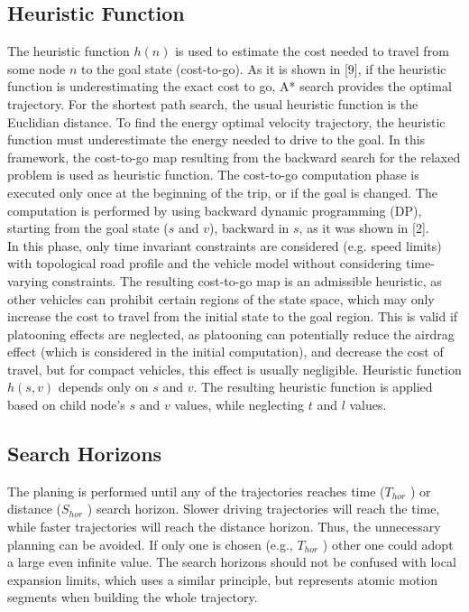 \documentclass{thesisreport}
\begin{document}
\subsection{Heuristic Function}
The heuristic function $h(n)$ is used to estimate the cost needed to travel from some node $n$ to the goal state (cost-to-go). As it is shown in [9], if the heuristic function is underestimating the exact cost to go, A* search provides the optimal trajectory. For the shortest path search, the usual heuristic function is the Euclidian distance. To find the energy optimal velocity trajectory, the heuristic function must underestimate the energy needed to drive to the goal. In this framework, the cost-to-go map resulting from the backward search for the relaxed problem is used as heuristic function. The cost-to-go computation phase is executed only once at the beginning of the trip, or if the goal is changed. The computation is performed by using backward dynamic programming (DP), starting from the goal state ($s$ and $v$), backward in $s$, as it was shown in [2].\\
\indent
In this phase, only time invariant constraints are considered (e.g. speed limits) with topological road profile and the vehicle model without considering time-varying constraints. The resulting cost-to-go map is an admissible heuristic, as other vehicles can prohibit certain regions of the state space, which may only increase the cost to travel from the initial state to the goal region. This is valid if platooning effects are neglected, as platooning can potentially reduce the airdrag effect (which is considered in the initial computation), and decrease the cost of travel, but for compact vehicles, this effect is usually negligible. Heuristic function $h(s,v)$ depends only on $s$ and $v$. The resulting heuristic function is applied based on child node’s $s$ and $v$ values, while neglecting $t$ and $l$ values.

\subsection{Search Horizons}
The planing is performed until any of the trajectories reaches time ($T_{hor}$ ) or distance ($S_{hor}$ ) search horizon. Slower driving trajectories will reach the time, while faster trajectories will reach the distance horizon. Thus, the unnecessary planning can be avoided. If only one is chosen (e.g., $T_{hor}$ ) other one could adopt a large even infinite value. The search horizons should not be confused with local expansion limits, which uses a similar principle, but represents atomic motion segments when building the whole trajectory.
\end{document}
